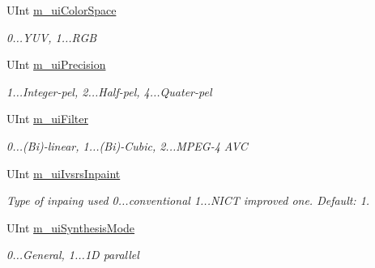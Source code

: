 \begin{DoxyCompactItemize}
\mbox{\label{class_c_parameter_view_interpolation_a2f49d7ef770cf172783a423a20842e87}} 
U\+Int \hyperlink{class_c_parameter_view_interpolation_a2f49d7ef770cf172783a423a20842e87}{m\+\_\+ui\+Color\+Space}
\begin{DoxyCompactList}\small\item\em 0...Y\+UV, 1...R\+GB \end{DoxyCompactList}\item 
\mbox{\label{class_c_parameter_view_interpolation_ac748b0316724e70b42e3d3ce4dd8ecd8}} 
U\+Int \hyperlink{class_c_parameter_view_interpolation_ac748b0316724e70b42e3d3ce4dd8ecd8}{m\+\_\+ui\+Precision}
\begin{DoxyCompactList}\small\item\em 1...Integer-\/pel, 2...Half-\/pel, 4...Quater-\/pel \end{DoxyCompactList}\item 
\mbox{\label{class_c_parameter_view_interpolation_a0797830a987dae974c6135c046a3bf13}} 
U\+Int \hyperlink{class_c_parameter_view_interpolation_a0797830a987dae974c6135c046a3bf13}{m\+\_\+ui\+Filter}
\begin{DoxyCompactList}\small\item\em 0...(Bi)-\/linear, 1...(Bi)-\/\+Cubic, 2...M\+P\+E\+G-\/4 A\+VC \end{DoxyCompactList}\item 
\mbox{\label{class_c_parameter_view_interpolation_ada21e49c03e5426f6026380b8a6c7b20}} 
U\+Int \hyperlink{class_c_parameter_view_interpolation_ada21e49c03e5426f6026380b8a6c7b20}{m\+\_\+ui\+Ivsrs\+Inpaint}
\begin{DoxyCompactList}\small\item\em Type of inpaing used 0...conventional 1...N\+I\+CT improved one. Default\+: 1. \end{DoxyCompactList}\item 
\mbox{\label{class_c_parameter_view_interpolation_a55d07723c90520b7d43b718dfbae0d57}} 
U\+Int \hyperlink{class_c_parameter_view_interpolation_a55d07723c90520b7d43b718dfbae0d57}{m\+\_\+ui\+Synthesis\+Mode}
\begin{DoxyCompactList}\small\item\em 0...General, 1...1D parallel \end{DoxyCompactList}\item 

\end{DoxyCompactItemize}
